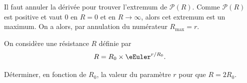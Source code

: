 \reponse{\reponseB{}}

\begin{corrigeNewpage}
Il faut annuler la dérivée pour trouver l'extremum de $\mathcal{P}(R)$. Comme $\mathcal{P}(R)$ est positive et vaut $0$ en $R=0$ et en $R\rightarrow \infty$, alors cet extremum est un maximum. 
On a alors, par annulation du numérateur $R_\text{max}=r$.
\end{corrigeNewpage}



\finEntrainement






\hauteurLargeurCadreReponse		{8mm}{4cm}
\typeEntrainement				{} %
\initialisationEntrainement


On considère une résistance $R$ définie par
\[
R=R_0\times \eEuler^{r/R_0}.
\]



\debutEntrainement



\begin{enonce}
Déterminer, en fonction de $R_0$, la valeur du paramètre $r$ pour que $R = 2R_0$.
\bigskip

\end{enonce}


